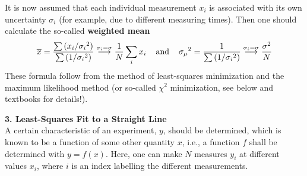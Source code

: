 \documentclass[12pt]{article}
\begin{document}
It is now assumed that each individual measurement $x_i$ is associated
with its own uncertainty $\sigma_i$ (for example, due to different measuring
times). Then one should calculate the so-called {\bf weighted mean}\\
\begin{displaymath}
\overline{x}=\frac{\sum{(x_i/{\sigma_i}^2)}}{\sum{(1/{\sigma_i}^2)}}
\stackrel{\sigma_i=\sigma}{\longrightarrow}\frac{1}{N}\sum_i{x_i}
\hspace*{4mm}\mbox{and}\hspace*{4mm}
{\sigma_\mu}^2=\frac{1}{\sum{(1/{\sigma_i}^2)}}
\stackrel{\sigma_i=\sigma}{\longrightarrow}\frac{\sigma^2}{N}
\end{displaymath}
These formula follow from the method of least-squares minimization
and the maximum likelihood method (or so-called $\chi^2$ minimization,
see below and textbooks for details!).

\newpage
{\large\bf 3. Least-Squares Fit to a Straight Line}\\
A certain characteristic of an experiment, $y$, should be determined,
which is known to be a function of some other quantity $x$, i.e.,
a function $f$ shall be determined with $y=f(x)$. Here, one can
make $N$ measures $y_i$ at different values $x_i$, where $i$ is an index
labelling the different measurements.\\
\end{document}
